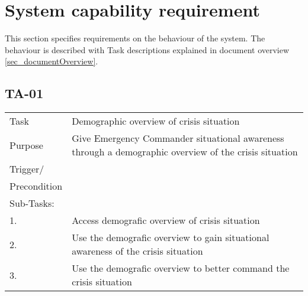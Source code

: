 
\newpage
\label{sec_functional}
\section{System capability requirement}
This section specifies requirements on the behaviour of the system. The behaviour is described with Task descriptions explained in document overview \ref{sec_documentOverview}.

\subsection{TA-01}
\begin{longtable}{| p{2.5cm}  | p{10cm} |  }
	\hline
	Task & Demographic overview of crisis situation  \\
	Purpose &  Give Emergency Commander situational awareness through a demographic overview of the crisis situation \\
	Trigger/ &  \\ Precondition &  \\
	\hline
	Sub-Tasks: & \\
	1. & Access demografic overview of crisis situation \\
	\hline
	2. & Use the demografic overview to gain situational awareness of the crisis situation \\
	\hline
	3. & Use the demografic overview to better command the crisis situation \\
	\hline
\end{longtable}


